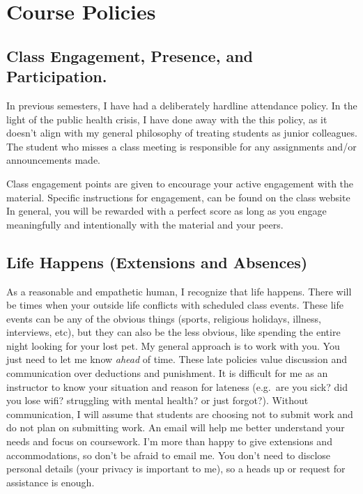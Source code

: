 \documentclass[11pt,]{article}
\begin{document}
\hypertarget{course-policies}{%
\section{Course Policies}\label{course-policies}}

\hypertarget{class-engagement-presence-and-participation.}{%
\subsection{Class Engagement, Presence, and
Participation.}\label{class-engagement-presence-and-participation.}}

In previous semesters, I have had a deliberately hardline attendance
policy. In the light of the public health crisis, I have done away with
the this policy, as it doesn't align with my general philosophy of
treating students as junior colleagues. The student who misses a class
meeting is responsible for any assignments and/or announcements made.

Class engagement points are given to encourage your active engagement
with the material. Specific instructions for engagement, can be found on
the class website In general, you will be rewarded with a perfect score
as long as you engage meaningfully and intentionally with the material
and your peers.

\hypertarget{life-happens-extensions-and-absences}{%
\subsection{Life Happens (Extensions and
Absences)}\label{life-happens-extensions-and-absences}}

As a reasonable and empathetic human, I recognize that life happens.
There will be times when your outside life conflicts with scheduled
class events. These life events can be any of the obvious things
(sports, religious holidays, illness, interviews, etc), but they can
also be the less obvious, like spending the entire night looking for
your lost pet. My general approach is to work with you. You just need to
let me know \emph{ahead} of time. These late policies value discussion
and communication over deductions and punishment. It is difficult for me
as an instructor to know your situation and reason for lateness
(e.g.~are you sick? did you lose wifi? struggling with mental health? or
just forgot?). Without communication, I will assume that students are
choosing not to submit work and do not plan on submitting work. An email
will help me better understand your needs and focus on coursework. I'm
more than happy to give extensions and accommodations, so don't be
afraid to email me. You don't need to disclose personal details (your
privacy is important to me), so a heads up or request for assistance is
enough.
\end{document}
